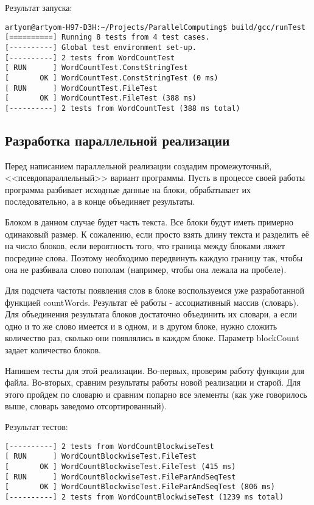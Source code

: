 Результат запуска:
\begin{lstlisting}
artyom@artyom-H97-D3H:~/Projects/ParallelComputing$ build/gcc/runTest 
[==========] Running 8 tests from 4 test cases.
[----------] Global test environment set-up.
[----------] 2 tests from WordCountTest
[ RUN      ] WordCountTest.ConstStringTest
[       OK ] WordCountTest.ConstStringTest (0 ms)
[ RUN      ] WordCountTest.FileTest
[       OK ] WordCountTest.FileTest (388 ms)
[----------] 2 tests from WordCountTest (388 ms total)
\end{lstlisting}

\subsection{Разработка параллельной реализации}

Перед написанием параллельной реализации создадим промежуточный, <<псевдопараллельный>> вариант программы. Пусть в процессе своей работы программа разбивает исходные данные на блоки, обрабатывает их последовательно, а в конце объединяет результаты.

Блоком в данном случае будет часть текста. Все блоки будут иметь примерно одинаковый размер. К сожалению, если просто взять длину текста и разделить её на число блоков, если вероятность того, что граница между блоками ляжет посредине слова. Поэтому необходимо передвинуть каждую границу так, чтобы она не разбивала слово пополам (например, чтобы она лежала на пробеле).

Для подсчета частоты появления слов в блоке воспользуемся уже разработанной функцией countWords. Результат её работы - ассоциативный массив (словарь). Для объединения результата блоков достаточно объединить их словари, а если одно и то же слово имеется и в одном, и в другом блоке, нужно сложить количество раз, сколько они появлялись в каждом блоке. Параметр blockCount задает количество блоков.

% 

Напишем тесты для этой реализации. Во-первых, проверим работу функции для файла. Во-вторых, сравним результаты работы новой реализации и старой. Для этого пройдем по словарю и сравним попарно все элементы (как уже говорилось выше, словарь заведомо отсортированный).

% 

Результат тестов:
\begin{lstlisting}
[----------] 2 tests from WordCountBlockwiseTest
[ RUN      ] WordCountBlockwiseTest.FileTest
[       OK ] WordCountBlockwiseTest.FileTest (415 ms)
[ RUN      ] WordCountBlockwiseTest.FileParAndSeqTest
[       OK ] WordCountBlockwiseTest.FileParAndSeqTest (806 ms)
[----------] 2 tests from WordCountBlockwiseTest (1239 ms total)
\end{lstlisting}

